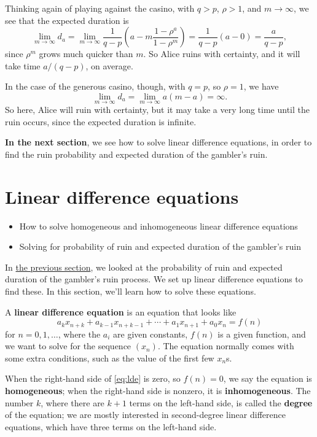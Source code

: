 \documentclass[
  a4paper,
]{article}
\providecommand{\tightlist}{%
  \setlength{\itemsep}{0pt}\setlength{\parskip}{0pt}}
\theoremstyle{definition}
\theoremstyle{definition}
\theoremstyle{definition}
\theoremstyle{remark}
\begin{document}
Thinking again of playing against the casino, with \(q > p\), \(\rho > 1\), and \(m \to \infty\), we see that the expected duration is
\[ \lim_{m\to\infty} d_a = \lim_{m\to\infty} \frac{1}{q-p} \left(a - m\frac{1-\rho^a}{1 - \rho^m} \right)  = \frac{1}{q-p} \left(a - 0 \right) = \frac{a}{q-p} , \]
since \(\rho^m\) grows much quicker than \(m\). So Alice ruins with certainty, and it will take time \(a/(q-p)\), on average.

In the case of the generous casino, though, with \(q = p\), so \(\rho = 1\), we have
\[ \lim_{m\to\infty} d_a =  \lim_{m\to\infty} a(m-a) = \infty .  \]
So here, Alice will ruin with certainty, but it may take a very long time until the ruin occurs, since the expected duration is infinite.

\textbf{In the next section}, we see how to solve linear difference equations, in order to find the ruin probability and expected duration of the gambler's ruin.

\hypertarget{S04-ldes}{%
\section{Linear difference equations}\label{S04-ldes}}

\begin{itemize}
\tightlist
\item
  How to solve homogeneous and inhomogeneous linear difference equations
\item
  Solving for probability of ruin and expected duration of the gambler's ruin
\end{itemize}

In \protect\hyperlink{S03-gamblers-ruin}{the previous section}, we looked at the probability of ruin and expected duration of the gambler's ruin process. We set up linear difference equations to find these. In this section, we'll learn how to solve these equations.

A \textbf{linear difference equation} is an equation that looks like
\begin{equation}
a_k x_{n+k} + a_{k-1} x_{n+k-1} + \cdots + a_1 x_{n+1} + a_0 x_n = f(n) \label{eq:lde} 
\end{equation}
for \(n = 0,1,\dots\), where the \(a_i\) are given constants, \(f(n)\) is a given function, and we want to solve for the sequence \((x_n)\). The equation normally comes with some extra conditions, such as the value of the first few \(x_n\)s.

When the right-hand side of \eqref{eq:lde} is zero, so \(f(n) = 0\), we say the equation is \textbf{homogeneous}; when the right-hand side is nonzero, it is \textbf{inhomogeneous}. The number \(k\), where there are \(k+1\) terms on the left-hand side, is called the \textbf{degree} of the equation; we are mostly interested in second-degree linear difference equations, which have three terms on the left-hand side.
\end{document}
